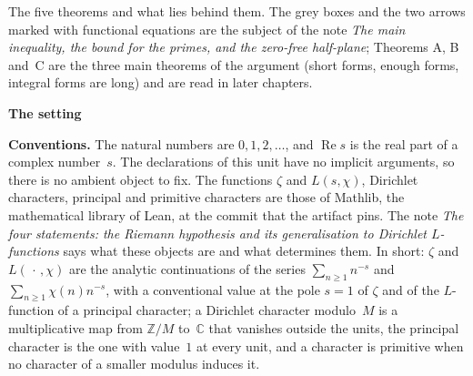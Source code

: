 \documentclass[11pt,a4paper]{article}
\newcommand{\m}[1]{\mbox{$#1$}}        %
\newcommand{\sect}[2]{\refstepcounter{section}\label{#2}\par\addvspace{19pt plus 4pt minus 2pt}\Needspace{7\baselineskip}%
  \noindent\llap{{\fontsize{13.2}{16}\selectfont\bfseries\color{inkfaint}\thesection}\hspace{9pt}}%
  {\fontsize{13.2}{16}\selectfont\bfseries\color{ink}#1}\par\nopagebreak\vspace{-1pt}}
\theoremstyle{plainx}
\theoremstyle{uprightx}
\newenvironment{conventions}{\par\addvspace{5pt}\noindent\textbf{Conventions.}\enspace\ignorespaces}{\par\addvspace{3pt}}
\newcommand{\CC}{\mathbb{C}}
\newcommand{\ZZ}{\mathbb{Z}}
\newcommand{\re}{\operatorname{Re}}
\begin{document}
\begin{center}
\end{center}
\vspace{-4pt}
{\fontsize{8.9}{12}\selectfont\color{inksoft}\noindent The five theorems and what lies behind them. The grey boxes
and the two arrows marked with functional equations are the subject of the note \emph{The main inequality, the
bound for the primes, and the zero-free half-plane}; Theorems A, B and~C are the three main theorems of the argument
(short forms, enough forms, integral forms are long) and are read in later chapters.\par}

\sect{The setting}{s:setting}
\begin{conventions}\label{c:conventions}
The natural numbers are \m{0,1,2,\dots}, and $\re s$ is the real part of a complex number~$s$. The declarations of
this unit have no implicit arguments, so there is no ambient object to fix. The functions $\zeta$ and $L(s,\chi)$,
Dirichlet characters, principal and primitive characters are those of Mathlib, the mathematical library of Lean,
at the commit that the artifact pins. The note \emph{The four statements: the Riemann hypothesis and its
generalisation to Dirichlet $L$-functions} says what these objects are and what determines them. In short:
$\zeta$ and \m{L(\,\cdot\,,\chi)} are the analytic continuations of the series \m{\sum_{n\ge1}n^{-s}} and
\m{\sum_{n\ge1}\chi(n)n^{-s}}, with a conventional value at the pole \m{s=1} of $\zeta$ and of the $L$-function of
a principal character; a Dirichlet character modulo~$M$ is a multiplicative map from \m{\ZZ/M} to~$\CC$ that
vanishes outside the units, the principal character is the one with value~$1$ at every unit, and a character is
primitive when no character of a smaller modulus induces it.
\end{conventions}
\end{document}

